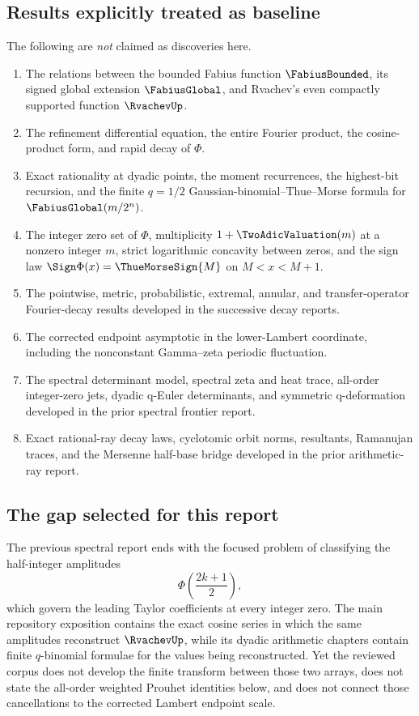 \documentclass[11pt,oneside]{article}
\theoremstyle{definition}
\theoremstyle{remark}
\newcommand{\PhiU}{\Phi}
\begin{document}
\subsection{Results explicitly treated as baseline}

The following are \emph{not} claimed as discoveries here.
\begin{enumerate}
 \item The relations between the bounded Fabius function $\FabiusBounded$, its signed global
 extension $\FabiusGlobal$, and Rvachev's even compactly supported function $\RvachevUp$.
 \item The refinement differential equation, the entire Fourier product, the
 cosine-product form, and rapid decay of $\PhiU$.
 \item Exact rationality at dyadic points, the moment recurrences, the
 highest-bit recursion, and the finite $q=1/2$ Gaussian-binomial--Thue--Morse
 formula for $\FabiusGlobal(m/2^n)$.
 \item The integer zero set of $\PhiU$, multiplicity $1+\TwoAdicValuation(m)$ at a nonzero
 integer $m$, strict logarithmic concavity between zeros, and the sign law
 $\Sign \PhiU(x)=\ThueMorseSign{M}$ on $M<x<M+1$.
 \item The pointwise, metric, probabilistic, extremal, annular, and transfer-operator
 Fourier-decay results developed in the successive decay reports.
 \item The corrected endpoint asymptotic in the lower-Lambert coordinate,
 including the nonconstant Gamma--zeta periodic fluctuation.
 \item The spectral determinant model, spectral zeta and heat trace, all-order
 integer-zero jets, dyadic q-Euler determinants, and symmetric q-deformation
 developed in the prior spectral frontier report.
 \item Exact rational-ray decay laws, cyclotomic orbit norms, resultants,
 Ramanujan traces, and the Mersenne half-base bridge developed in the prior
 arithmetic-ray report.
\end{enumerate}

\subsection{The gap selected for this report}

The previous spectral report ends with the focused problem of classifying the
half-integer amplitudes
\[
 \PhiU\!\left(\frac{2k+1}{2}\right),
\]
which govern the leading Taylor coefficients at every integer zero.  The main
repository exposition contains the exact cosine series in which the same
amplitudes reconstruct $\RvachevUp$, while its dyadic arithmetic chapters contain
finite $q$-binomial formulae for the values being reconstructed.  Yet the
reviewed corpus does not develop the finite transform between those two arrays,
does not state the all-order weighted Prouhet identities below, and does not
connect those cancellations to the corrected Lambert endpoint scale.
\end{document}
